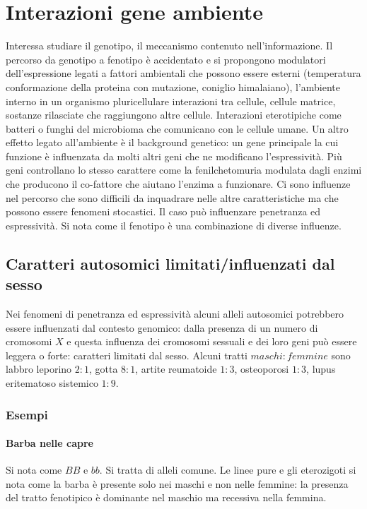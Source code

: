 \chapter{Interazioni gene ambiente}
Interessa studiare il genotipo, il meccanismo contenuto nell'informazione. Il percorso da genotipo a fenotipo \`e accidentato e si propongono modulatori dell'espressione legati a fattori
ambientali che possono essere esterni (temperatura conformazione della proteina con mutazione, coniglio himalaiano), l'ambiente interno in un organismo pluricellulare interazioni tra
cellule, cellule matrice, sostanze rilasciate che raggiungono altre cellule. Interazioni eterotipiche come batteri o funghi del microbioma che comunicano con le cellule umane. Un
altro effetto legato all'ambiente \`e il background genetico: un gene principale la cui funzione \`e influenzata da molti altri geni che ne modificano l'espressivit\`a. Pi\`u geni
controllano lo stesso carattere come la fenilchetomuria modulata dagli enzimi che producono il co-fattore che aiutano l'enzima a funzionare. Ci sono influenze nel percorso che sono
difficili da inquadrare nelle altre caratteristiche ma che possono essere fenomeni stocastici. Il caso pu\`o influenzare penetranza ed espressivit\`a. Si nota come il fenotipo 
\`e una combinazione di diverse influenze.
\section{Caratteri autosomici limitati/influenzati dal sesso}
Nei fenomeni di penetranza ed espressivit\`a alcuni alleli autosomici potrebbero essere influenzati dal contesto genomico: dalla presenza di un numero di cromosomi $X$ e questa 
influenza dei cromosomi sessuali e dei loro geni pu\`o essere leggera o forte: caratteri limitati dal sesso. Alcuni tratti $maschi:femmine$ sono labbro leporino $2:1$, gotta $8:1$, 
artite reumatoide $1:3$, osteoporosi $1:3$, lupus eritematoso sistemico $1:9$. 
\subsection{Esempi}
\subsubsection{Barba nelle capre}
Si nota come $BB$ e $bb$. Si tratta di alleli comune. Le linee pure e gli eterozigoti si nota come la barba \`e presente solo nei maschi e non nelle femmine: la presenza del tratto 
fenotipico \`e dominante nel maschio ma recessiva nella femmina. 
